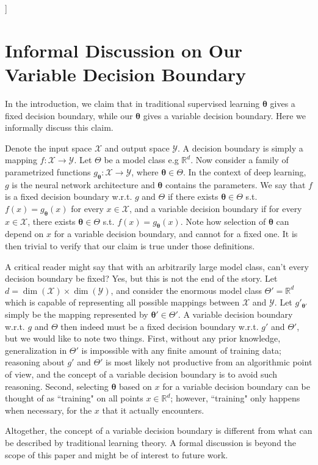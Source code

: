 \documentclass{article}
\newcommand{\scrX}{\mathcal{X}}
\newcommand{\scrY}{\mathcal{Y}}
\theoremstyle{plain}
\theoremstyle{remark}
\theoremstyle{definition}
\def\vtheta{{\bm{\theta}}}
\newcommand{\R}{\mathbb{R}}
\begin{document}
\vskip 0.3in
]

\section{Informal Discussion on Our Variable Decision Boundary}
\label{vdb}
In the introduction, we claim that in traditional supervised learning $\vtheta$ gives a fixed decision boundary, while our $\vtheta$ gives a variable decision boundary. Here we informally discuss this claim.

Denote the input space $\scrX$ and output space $\scrY$. 
A decision boundary is simply a mapping $f: \scrX \rightarrow \scrY$.
Let $\Theta$ be a model class e.g $\mathbb{R}^d$.
Now consider a family of parametrized functions $g_\vtheta: \scrX \rightarrow \scrY$, where $\vtheta\in \Theta$.
In the context of deep learning, $g$ is the neural network architecture and $\vtheta$ contains the parameters. 
We say that $f$ is a fixed decision boundary w.r.t. $g$ and $\Theta$
if there exists $\vtheta\in\Theta$ s.t. $f(x) = g_\vtheta(x)$ for every $x\in\scrX$,
and a variable decision boundary if for every $x\in\scrX$, there exists $\vtheta\in\Theta$ s.t. $f(x) = g_\vtheta(x)$.
Note how selection of $\vtheta$ can depend on $x$ for a variable decision boundary, and cannot for a fixed one. It is then trivial to verify that our claim is true under those definitions.

A critical reader might say that with an arbitrarily large model class, can't every decision boundary be fixed?
Yes, but this is not the end of the story.
Let $d = \dim(\scrX) \times \dim(\scrY)$, and consider the enormous model class $\Theta' = \R^d$ which is capable of representing all possible mappings between $\scrX$ and $\scrY$.
Let $g'_{\vtheta'}$ simply be the mapping represented by $\vtheta'\in\Theta'$.
A variable decision boundary w.r.t. $g$ and $\Theta$ then indeed must be a fixed decision boundary w.r.t. $g'$ and $\Theta'$, but we would like to note two things.
First, without any prior knowledge, generalization in $\Theta'$ is impossible with any finite amount of training data; 
reasoning about  $g'$ and $\Theta'$ is most likely not productive from an algorithmic point of view, and the concept of a variable decision boundary is to avoid such reasoning.
Second, selecting $\vtheta$ based on $x$ for a variable decision boundary can be thought of as ``training" on all points $x\in\R^d$; however, ``training" only happens when necessary, for the $x$ that it actually encounters. 

Altogether, the concept of a variable decision boundary is different from what can be described
by traditional learning theory. 
A formal discussion is beyond the scope of this paper and might be of interest to future work.
\end{document}
